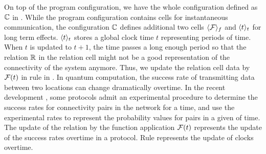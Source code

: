 On top of the program configuration, we have the whole configuration defined as $\mathbb{C}$ in . 
While the program configuration contains cells for instantaneous communication,
the configuration $\mathbb{C}$ defines additional two cells $\langle \mathcal{F} \rangle_{f}$ and $\langle t \rangle_{t}$ for long term effects.
$\langle t \rangle_{t}$ stores a global clock time $t$ representing periods of time. When $t$ is updated to $t+1$, the time passes a long enough period so that the relation $\mathbb{R}$ in the relation cell might not be a good representation of the connectivity of the system anymore.
Thus, we update the relation cell data by $\mathcal{F}(t)$ in rule  in .
In quantum computation, the success rate of transmitting data between two locations can change dramatically overtime.
In the recent development \cite{https://doi.org/10.48550/arxiv.2205.06300}, 
some protocols admit an experimental procedure to determine the success rates for connectivity pairs in the network for a time, and use the experimental rates to represent the probability values for pairs in a given of time.
The update of the relation by the function application $\mathcal{F}(t)$ represents the update of the success rates overtime in a protocol.
Rule  represents the update of clocks overtime.



